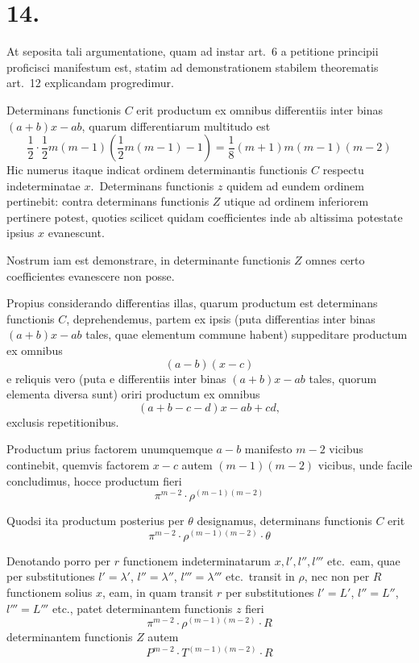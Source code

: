 \documentclass[12pt,a4paper]{article}
\theoremstyle{plain}
\begin{document}
\section*{14.}

At seposita tali argumentatione, quam ad instar art.\ 6 a petitione principii
proficisci manifestum est, statim ad demonstrationem stabilem theorematis art.\ 12
explicandam progredimur.

Determinans functionis $C$ erit productum ex omnibus differentiis inter binas
$(a+b)x - ab$,
quarum differentiarum multitudo est
\[
\frac{1}{2} \cdot \frac{1}{2}m(m-1) \left(\frac{1}{2}m(m-1)-1\right) = \frac{1}{8}(m+1)m(m-1)(m-2)
\]
Hic numerus itaque indicat ordinem determinantis functionis $C$ respectu indeterminatae $x$.\ Determinans functionis $z$ quidem ad eundem ordinem pertinebit:
contra determinans functionis $Z$ utique ad ordinem inferiorem pertinere potest,
quoties scilicet quidam coefficientes inde ab altissima potestate ipsius $x$ evanescunt.

Nostrum iam est demonstrare, in determinante functionis $Z$ omnes certo
coefficientes evanescere non posse.

Propius considerando differentias illas, quarum productum est determinans functionis $C$, deprehendemus, partem ex ipsis (puta differentias inter binas
$(a+b)x - ab$
tales, quae elementum commune habent) suppeditare
productum ex omnibus
\[
(a-b)(x-c)
\]
e reliquis vero (puta e differentiis inter binas $(a+b)x - ab$
tales, quorum elementa diversa sunt) oriri
productum ex omnibus
\[
(a+b-c-d)x - ab + cd,
\]
exclusis repetitionibus.

Productum prius factorem unumquemque $a-b$ manifesto $m-2$ vicibus continebit, quemvis factorem $x-c$ autem $(m-1)(m-2)$ vicibus, unde facile concludimus, hocce productum fieri
\[
\pi^{m-2} \cdot \rho^{(m-1)(m-2)}
\]

Quodsi ita productum posterius per $\theta$ designamus, determinans functionis $C$ erit
\[
\pi^{m-2} \cdot \rho^{(m-1)(m-2)} \cdot \theta
\]

Denotando porro per $r$ functionem indeterminatarum $x, l', l'', l'''$ etc.\ eam, quae
per substitutiones $l' = \lambda'$, $l'' = \lambda''$, $l''' = \lambda'''$ etc.\ transit in $\rho$, nec non per $R$
functionem solius $x$, eam, in quam transit $r$ per substitutiones $l' = L'$, $l'' = L''$,
$l''' = L'''$ etc., patet determinantem functionis $z$ fieri
\[
\pi^{m-2} \cdot \rho^{(m-1)(m-2)} \cdot R
\]
determinantem functionis $Z$ autem
\[
P^{m-2} \cdot T^{(m-1)(m-2)} \cdot R
\]
\end{document}
